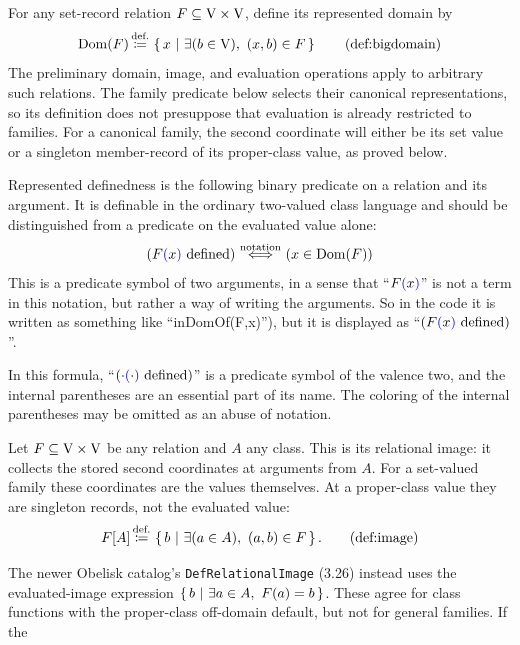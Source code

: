 \begin{definition}
For any set-record relation $F\subseteq\mathrm{V}\times\mathrm{V}$, define its
represented domain by
\[
\Dom(F) \eqdef \cc{x}{\exists (b\in\V),\ (x,b)\in F}
\clabeltagd{def}{bigdomain}
\]
The preliminary domain, image, and evaluation operations apply to arbitrary
such relations. The family predicate below selects their canonical
representations, so its definition does not presuppose that evaluation is
already restricted to families. For a canonical family, the second
coordinate will either be its set value or a singleton member-record of
its proper-class value, as proved below.
\end{definition}
\begin{notation}
Represented definedness is the following binary predicate on a relation
and its argument. It is definable in the ordinary two-valued class
language and should be distinguished from a predicate on the evaluated
value alone:
\[
(F\textcolor{blue}{(}x\textcolor{blue}{)}\text{ defined})
\ {\stackrel{{\textrm{notation}}}{\Longleftrightarrow}}\ 
(x\in\mathrm{Dom}(F))
\]
This is a predicate symbol of two arguments, in a sense that ``$F\textcolor{blue}{(\textcolor{black}{x})}$'' is not a term in this notation, but rather a way of writing the arguments. So in the code it is written as something like ``inDomOf(F,x)''), but it is displayed as ``$(F\textcolor{blue}{(}x\textcolor{blue}{)}\text{ defined})$''.

In this formula, ``$(\cdot\textcolor{blue}{(\textcolor{black}{\cdot})}\text{ defined})$'' is a predicate symbol of the valence two, and the internal parentheses are an essential part of its name. The coloring of the internal parentheses may be omitted as an abuse of notation.
\end{notation}
\begin{definition}[image]
Let $F\subseteq\mathrm{V}\times\mathrm{V}$ be any relation and $A$ any class. This is its relational
image: it collects the stored second coordinates at arguments from $A$.
For a set-valued family these coordinates are the values themselves. At a
proper-class value they are singleton records, not the evaluated value:
\[
F[A] \eqdef \cc{b}{\exists (a\in A),\ (a,b)\in F}.
\clabeltagd{def}{image}
\]
\end{definition}
The newer Obelisk catalog's \texttt{DefRelationalImage} (3.26) instead
uses the evaluated-image expression
$\left\{\,b\ \middle|\ \exists a\in A,\ F(a)=b\,\right\}$. These agree for class functions with
the proper-class off-domain default, but not for general families. If the
